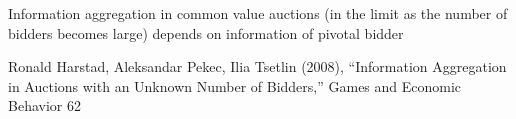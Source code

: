 \cite{kremer2002information}
Information aggregation in common value auctions (in the limit as the number of bidders becomes large)
depends on information of pivotal bidder


 Ronald Harstad, Aleksandar Pekec, Ilia Tsetlin (2008), “Information Aggregation in
Auctions with an Unknown Number of Bidders,” Games and Economic Behavior 62












